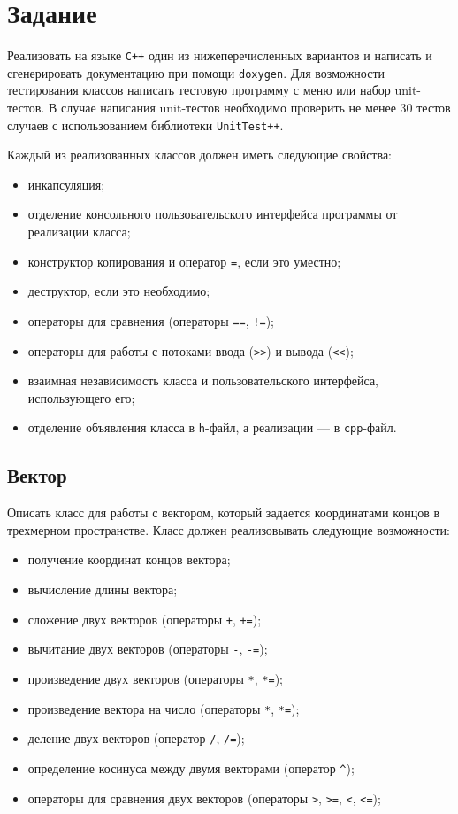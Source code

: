 \documentclass[a4paper,12pt]{article}
\begin{document}
\section{Задание}
\label{sec:Task}

Реализовать на языке \verb|С++| один из нижеперечисленных вариантов и
написать и сгенерировать документацию при помощи \verb|doxygen|. Для
возможности тестирования классов написать тестовую программу с меню
или набор unit-тестов. В случае написания unit-тестов необходимо
проверить не менее 30 тестов случаев с использованием библиотеки
\verb|UnitTest++|.

Каждый из реализованных классов должен иметь следующие свойства:

\begin{itemize}
\item инкапсуляция;
\item отделение консольного пользовательского интерфейса программы от
  реализации класса;
\item конструктор копирования и оператор \lstinline|=|, если это
  уместно;
\item деструктор, если это необходимо;
\item операторы для сравнения (операторы \lstinline|==|,
  \lstinline|!=|);
\item операторы для работы с потоками ввода (\lstinline|>>|) и вывода
  (\lstinline|<<|);
\item взаимная независимость класса и пользовательского интерфейса,
  использующего его;
\item отделение объявления класса в \texttt{h}-файл, а реализации ---
  в \texttt{cpp}-файл.
\end{itemize}

\subsection{Вектор}

Описать класс для работы с вектором, который задается координатами
концов в трехмерном пространстве.  Класс должен реализовывать
следующие возможности:

\begin{itemize}
\item получение координат концов вектора;
\item вычисление длины вектора;
\item сложение двух векторов (операторы \lstinline|+|,
  \lstinline|+=|);
\item вычитание двух векторов (операторы \lstinline|-|,
  \lstinline|-=|);
\item произведение двух векторов (операторы \lstinline|*|,
  \lstinline|*=|);
\item произведение вектора на число (операторы \lstinline|*|,
  \lstinline|*=|);
\item деление двух векторов (оператор \lstinline|/|, \lstinline|/=|);
\item определение косинуса между двумя векторами (оператор
  \lstinline|^|);
\item операторы для сравнения двух векторов (операторы \lstinline|>|,
  \lstinline|>=|, \lstinline|<|, \lstinline|<=|);
\end{itemize}
\end{document}
